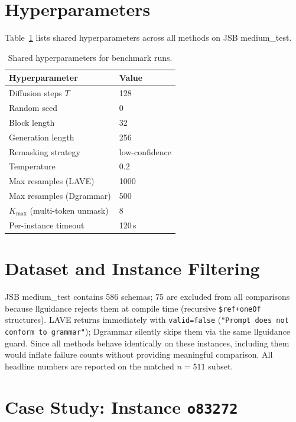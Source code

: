 \documentclass[11pt]{article}
\begin{document}


\appendix

\section{Hyperparameters}
\label{app:hyperparams}

Table~\ref{tab:hyperparams} lists shared hyperparameters across all methods on JSB medium\_test.

\begin{table}[h]
\small
\centering
\begin{tabular}{ll}
\toprule
\textbf{Hyperparameter} & \textbf{Value} \\
\midrule
Diffusion steps $T$       & 128 \\
Random seed               & 0 \\
Block length              & 32 \\
Generation length         & 256 \\
Remasking strategy        & low-confidence \\
Temperature               & 0.2 \\
Max resamples (LAVE)      & 1000 \\
Max resamples (Dgrammar) & 500 \\
$K_{\max}$ (multi-token unmask)   & 8 \\
Per-instance timeout      & 120\,s \\
\bottomrule
\end{tabular}
\caption{Shared hyperparameters for benchmark runs.}
\label{tab:hyperparams}
\end{table}

\section{Dataset and Instance Filtering}
\label{app:data}

JSB medium\_test contains 586 schemas; 75 are excluded from all comparisons because llguidance rejects them at compile time (recursive \texttt{\$ref+oneOf} structures). LAVE returns immediately with \texttt{valid=false} (\texttt{"Prompt does not conform to grammar"}); Dgrammar silently skips them via the same llguidance guard. Since all methods behave identically on these instances, including them would inflate failure counts without providing meaningful comparison. All headline numbers are reported on the matched $n{=}511$ subset.

\section{Case Study: Instance \texttt{o83272}}
\label{app:case}
\end{document}
